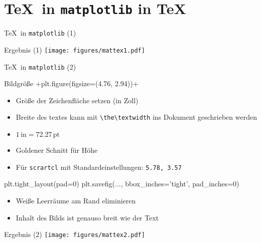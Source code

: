 \section{\TeX\ in \texttt{matplotlib} in \TeX}

\begin{frame}[fragile]{\TeX\ in \texttt{matplotlib} (1)}
\end{frame}

\AddToShipoutPictureFG*{\ShowFramePicture}
\begin{frame}{Ergebnis (1)}
  \centering
  \texttt{[image: figures/mattex1.pdf]}
\end{frame}

\begin{frame}[fragile]{\TeX\ in \texttt{matplotlib} (2)}
\end{frame}

\begin{frame}[fragile]{Bildgröße}
  \lstpythoninline+plt.figure(figsize=(4.76, 2.94))+
  \begin{itemize}
    \item Größe der Zeichenfläche setzen (in Zoll)
    \item Breite des textes kann mit \lstinline+\the\textwidth+ ins Dokument geschrieben werden
    \item $1\,\mathrm{in} = \num{72.27}\,\mathrm{pt}$
    \item Goldener Schnitt für Höhe
    \item Für \texttt{scrartcl} mit Standardeinstellungen: \texttt{5.78, 3.57}
  \end{itemize}

  \begin{lstpython}
    plt.tight_layout(pad=0)
    plt.savefig(..., bbox_inches='tight', pad_inches=0)
  \end{lstpython}
  \begin{itemize}
    \item Weiße Leerräume am Rand eliminieren
    \item Inhalt des Bilds ist genauso breit wie der Text
  \end{itemize}
\end{frame}

\AddToShipoutPictureFG*{\ShowFramePicture}
\begin{frame}{Ergebnis (2)}
  \centering
  \texttt{[image: figures/mattex2.pdf]}
\end{frame}

